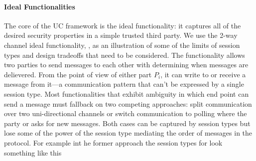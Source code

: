 %
%

\paragraph*{\textbf{Ideal Functionalities}}
The core of the UC framework is the ideal functionality: it captures all of the desired security properties in a simple trusted third party.
We use the 2-way channel ideal functionality, \Fauth, as an illustration of some of the limits of session types and design tradeoffs that need to be considered.
The functionality allows two parties to send messages to each other with \A determining when messages are delievered.
From the point of view of either part $P_i$, it can write to \Fauth or receive a message from it---a communication pattern that can't be expressed by a single session type.
Most functionalities that exhibit ambiguity in which end point can send a message must fallback on two competing approaches: split communication over two uni-directional channels or switch communication to polling where the party or \A asks \Fauth for new messages.
Both cases can be captured by session types but lose some of the power of the session type mediating the order of messages in the protocol. 
For example int he former approach the session types for \Fauth look something like this

